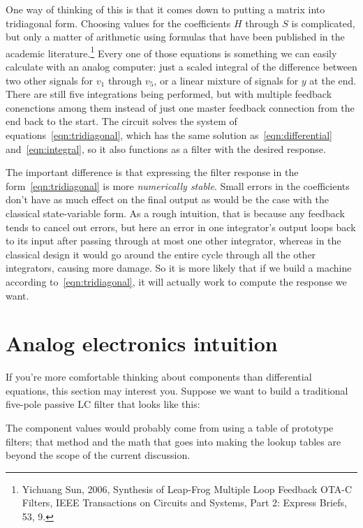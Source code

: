 One way of thinking of this is that it comes down to putting a matrix into
tridiagonal form.  Choosing values for the coefficients $H$ through $S$ is
complicated, but only a matter of arithmetic using formulas that have been
published in the academic literature.\footnote{Yichuang Sun, 2006, Synthesis
of Leap-Frog Multiple Loop Feedback OTA-C Filters, IEEE Transactions on
Circuits and Systems, Part 2: Express Briefs, 53, 9.} Every one of those
equations is something we can easily calculate with an analog computer: just
a scaled integral of the difference between two other signals for $v_1$
through $v_5$, or a linear mixture of signals for $y$ at the end.  There are
still five integrations being performed, but with multiple feedback
conenctions among them instead of just one master feedback connection from
the end back to the start.  The circuit solves the system of
equations~\eqref{eqn:tridiagonal}, which has the same solution
as~\eqref{eqn:differential} and~\eqref{eqn:integral}, so it also functions
as a filter with the desired response.

The important difference is that expressing the filter response in the
form~\eqref{eqn:tridiagonal} is more \emph{numerically stable}.  Small
errors in the coefficients don't have as much effect on the final output as
would be the case with the classical state-variable form.  As a rough
intuition, that is because any feedback tends to cancel out errors, but here
an error in one integrator's output loops back to its input after passing
through at most one other integrator, whereas in the classical design it
would go around the entire cycle through all the other integrators, causing
more damage.  So it is more likely that if we build a machine according
to~\eqref{eqn:tridiagonal}, it will actually work to compute the response we
want.


\section{Analog electronics intuition}

If you're more comfortable thinking about components than differential
equations, this section may interest you.  Suppose we want to build
a traditional five-pole passive LC filter that looks like this:

{\centering\par}

The component values would probably come from using a table of prototype
filters; that method and the math that goes into making the lookup
tables are beyond the scope of the current discussion.

